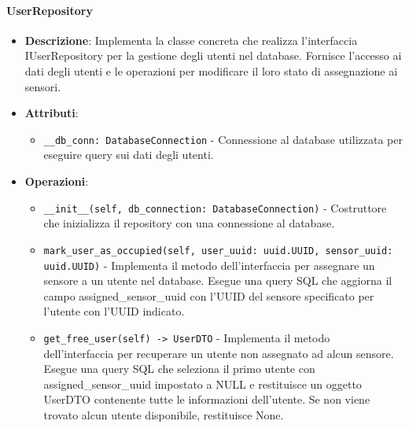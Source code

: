 \documentclass[10pt]{article}
\begin{document}
    \paragraph{UserRepository}
    \begin{itemize} 
    \item \textbf{Descrizione}: Implementa la classe concreta che realizza l'interfaccia IUserRepository per la gestione degli utenti nel database. Fornisce l'accesso ai dati degli utenti e le operazioni per modificare il loro stato di assegnazione ai sensori.
    \item \textbf{Attributi}:
    \begin{itemize}
        \item \texttt{\_\_db\_conn: DatabaseConnection} - Connessione al database utilizzata per eseguire query sui dati degli utenti.
    \end{itemize}
    
    \item \textbf{Operazioni}:
    \begin{itemize}
        \item \texttt{\_\_init\_\_(self, db\_connection: DatabaseConnection)} - Costruttore che inizializza il repository con una connessione al database.
        
        \item \texttt{mark\_user\_as\_occupied(self, user\_uuid: uuid.UUID, sensor\_uuid: uuid.UUID)} - Implementa il metodo dell'interfaccia per assegnare un sensore a un utente nel database. Esegue una query SQL che aggiorna il campo assigned\_sensor\_uuid con l'UUID del sensore specificato per l'utente con l'UUID indicato.
        
        \item \texttt{get\_free\_user(self) -> UserDTO} - Implementa il metodo dell'interfaccia per recuperare un utente non assegnato ad alcun sensore. Esegue una query SQL che seleziona il primo utente con assigned\_sensor\_uuid impostato a NULL e restituisce un oggetto UserDTO contenente tutte le informazioni dell'utente. Se non viene trovato alcun utente disponibile, restituisce None.
    \end{itemize}
    \end{itemize}
\end{document}
